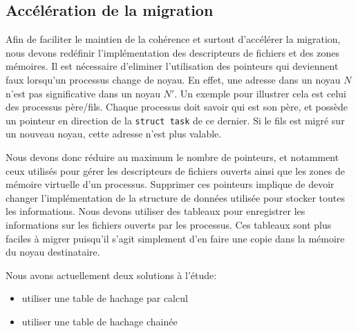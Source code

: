 

    \subsection{Accélération de la migration}

      Afin de faciliter le maintien de la cohérence et surtout d'accélérer la
      migration, nous devons redéfinir l'implémentation des descripteurs de
      fichiers et des zones mémoires. Il est nécessaire d'eliminer l'utilisation
      des pointeurs qui deviennent faux lorsqu'un processus change de noyau. En
      effet, une adresse dans un noyau $N$ n'est pas significative dans un noyau
      $N'$. Un exemple pour illustrer cela est celui des processus
      père/fils. Chaque processus doit savoir qui est son père, et possède un
      pointeur en direction de la \texttt{struct task} de ce dernier. Si le fils
      est migré sur un nouveau noyau, cette adresse n'est plus valable.

      Nous devons donc réduire au maximum le nombre de pointeurs, et notamment
      ceux utilisés pour gérer les descripteurs de fichiers ouverts ainsi que
      les zones de mémoire virtuelle d'un processus. Supprimer ces pointeurs
      implique de devoir changer l'implémentation de la structure de données
      utilisée pour stocker toutes les informations. Nous devons utiliser des
      tableaux pour enregistrer les informations sur les fichiers ouverts par
      les processus. Ces tableaux sont plus faciles à migrer puisqu'il s'agit
      simplement d'en faire une copie dans la mémoire du noyau destinataire.

      Nous avons actuellement deux solutions à l'étude:
      \begin{itemize}
        \item utiliser une table de hachage par calcul
        \item utiliser une table de hachage chainée
      \end{itemize}

